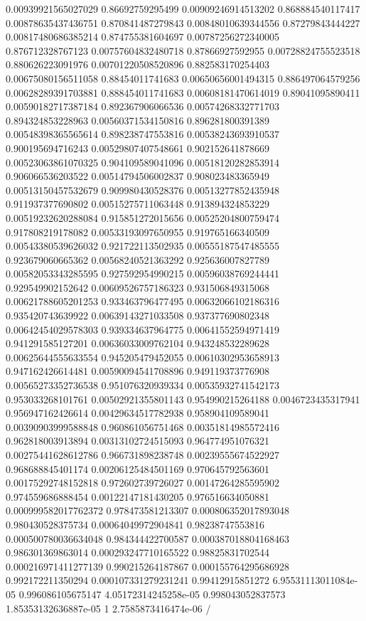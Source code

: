 \begin{table}
\begin{tabu}
\begin{sparkline}{10}
0.00939921565027029 0.86692759295499 0.00909246914513202 0.868884540117417 0.00878635437436751 0.870841487279843 0.00848010639344556 0.87279843444227 0.00817480686385214 0.874755381604697 0.00787256272340005 0.876712328767123 0.00757604832480718 0.87866927592955 0.00728824755523518 0.880626223091976 0.00701220508520896 0.882583170254403 0.00675080156511058 0.88454011741683 0.00650656001494315 0.886497064579256 0.00628289391703881 0.888454011741683 0.00608181470614019 0.89041095890411 0.00590182717387184 0.892367906066536 0.00574268332771703 0.894324853228963 0.00560371534150816 0.896281800391389 0.00548398365565614 0.898238747553816 0.00538243693910537 0.900195694716243 0.00529807407548661 0.902152641878669 0.00523063861070325 0.904109589041096 0.00518120282853914 0.906066536203522 0.00514794506002837 0.908023483365949 0.00513150457532679 0.909980430528376 0.00513277852435948 0.911937377690802 0.00515275711063448 0.913894324853229 0.00519232620288084 0.915851272015656 0.00525204800759474 0.917808219178082 0.00533193097650955 0.919765166340509 0.00543380539626032 0.921722113502935 0.00555187547485555 0.923679060665362 0.00568240521363292 0.925636007827789 0.00582053343285595 0.927592954990215 0.00596038769244441 0.929549902152642 0.00609526757186323 0.931506849315068 0.00621788605201253 0.933463796477495 0.00632066102186316 0.935420743639922 0.00639143271033508 0.937377690802348 0.00642454029578303 0.939334637964775 0.00641552594971419 0.941291585127201 0.00636033009762104 0.943248532289628 0.00625644555633554 0.945205479452055 0.00610302953658913 0.947162426614481 0.00590094541708896 0.949119373776908 0.00565273352736538 0.951076320939334 0.00535932741542173 0.953033268101761 0.00502921355801143 0.954990215264188 0.0046723435317941 0.956947162426614 0.00429634517782938 0.958904109589041 0.00390903999588848 0.960861056751468 0.00351814985572416 0.962818003913894 0.00313102724515093 0.964774951076321 0.00275441628612786 0.966731898238748 0.00239555674522927 0.968688845401174 0.00206125484501169 0.970645792563601 0.00175292748152818 0.972602739726027 0.00147264285595902 0.974559686888454 0.00122147181430205 0.976516634050881 0.000999582017762372 0.978473581213307 0.000806352017893048 0.980430528375734 0.00064049972904841 0.98238747553816 0.000500780036634048 0.984344422700587 0.000387018804168463 0.986301369863014 0.000293247710165522 0.98825831702544 0.000216971411277139 0.990215264187867 0.000155764295686928 0.992172211350294 0.000107331279231241 0.99412915851272 6.95531113011084e-05 0.996086105675147 4.05172314245258e-05 0.998043052837573 1.85353132636887e-05 1 2.7585873416474e-06 /

\end{sparkline}
\end{tabu}
\end{table}
